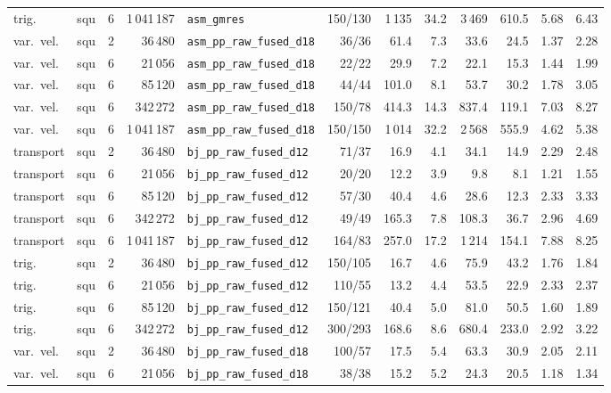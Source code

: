\begin{tabular}{llrrlrrrrrrr}
trig. & squ & 6 & 1\,041\,187 & \texttt{asm\_gmres} & 150/130 & 1\,135 & 34.2 & 3\,469 & 610.5 & 5.68 & 6.43\\
var.\ vel. & squ & 2 & 36\,480 & \texttt{asm\_pp\_raw\_fused\_d18} & 36/36 & 61.4 & 7.3 & 33.6 & 24.5 & 1.37 & 2.28\\
var.\ vel. & squ & 6 & 21\,056 & \texttt{asm\_pp\_raw\_fused\_d18} & 22/22 & 29.9 & 7.2 & 22.1 & 15.3 & 1.44 & 1.99\\
var.\ vel. & squ & 6 & 85\,120 & \texttt{asm\_pp\_raw\_fused\_d18} & 44/44 & 101.0 & 8.1 & 53.7 & 30.2 & 1.78 & 3.05\\
var.\ vel. & squ & 6 & 342\,272 & \texttt{asm\_pp\_raw\_fused\_d18} & 150/78 & 414.3 & 14.3 & 837.4 & 119.1 & 7.03 & 8.27\\
var.\ vel. & squ & 6 & 1\,041\,187 & \texttt{asm\_pp\_raw\_fused\_d18} & 150/150 & 1\,014 & 32.2 & 2\,568 & 555.9 & 4.62 & 5.38\\
transport & squ & 2 & 36\,480 & \texttt{bj\_pp\_raw\_fused\_d12} & 71/37 & 16.9 & 4.1 & 34.1 & 14.9 & 2.29 & 2.48\\
transport & squ & 6 & 21\,056 & \texttt{bj\_pp\_raw\_fused\_d12} & 20/20 & 12.2 & 3.9 & 9.8 & 8.1 & 1.21 & 1.55\\
transport & squ & 6 & 85\,120 & \texttt{bj\_pp\_raw\_fused\_d12} & 57/30 & 40.4 & 4.6 & 28.6 & 12.3 & 2.33 & 3.33\\
transport & squ & 6 & 342\,272 & \texttt{bj\_pp\_raw\_fused\_d12} & 49/49 & 165.3 & 7.8 & 108.3 & 36.7 & 2.96 & 4.69\\
transport & squ & 6 & 1\,041\,187 & \texttt{bj\_pp\_raw\_fused\_d12} & 164/83 & 257.0 & 17.2 & 1\,214 & 154.1 & 7.88 & 8.25\\
trig. & squ & 2 & 36\,480 & \texttt{bj\_pp\_raw\_fused\_d12} & 150/105 & 16.7 & 4.6 & 75.9 & 43.2 & 1.76 & 1.84\\
trig. & squ & 6 & 21\,056 & \texttt{bj\_pp\_raw\_fused\_d12} & 110/55 & 13.2 & 4.4 & 53.5 & 22.9 & 2.33 & 2.37\\
trig. & squ & 6 & 85\,120 & \texttt{bj\_pp\_raw\_fused\_d12} & 150/121 & 40.4 & 5.0 & 81.0 & 50.5 & 1.60 & 1.89\\
trig. & squ & 6 & 342\,272 & \texttt{bj\_pp\_raw\_fused\_d12} & 300/293 & 168.6 & 8.6 & 680.4 & 233.0 & 2.92 & 3.22\\
var.\ vel. & squ & 2 & 36\,480 & \texttt{bj\_pp\_raw\_fused\_d18} & 100/57 & 17.5 & 5.4 & 63.3 & 30.9 & 2.05 & 2.11\\
var.\ vel. & squ & 6 & 21\,056 & \texttt{bj\_pp\_raw\_fused\_d18} & 38/38 & 15.2 & 5.2 & 24.3 & 20.5 & 1.18 & 1.34\\

\end{tabular}
